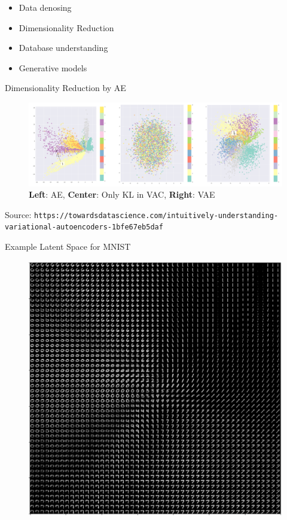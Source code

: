 \documentclass[handout,xcolor=pdftex,dvipsnames,table,mathserif]{beamer}
\begin{document}

\begin{frame}
\begin{itemize}
\item Data denosing
\item Dimensionality Reduction
\item Database understanding
\item Generative models
\end{itemize}
\end{frame}


\begin{frame}{Dimensionality Reduction by AE}
\begin{figure}
\includegraphics[width=.75\columnwidth]{../graphics/VAEMNIST}
\caption{\textbf{Left}: AE, \textbf{Center}: Only KL in VAC, \textbf{Right}: VAE}
\end{figure}
Source: \texttt{https://towardsdatascience.com/intuitively-understanding-variational-autoencoders-1bfe67eb5daf}
\end{frame}

\begin{frame}{Example Latent Space for MNIST}
\begin{figure}
\includegraphics[width=.75\columnwidth]{../graphics/LatentMNIST}
\end{figure}
\end{frame}
\end{document}
